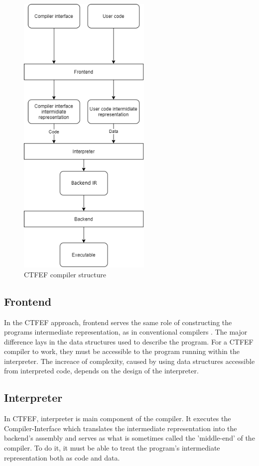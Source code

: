 \begin{figure}
	\includegraphics[height=14cm]{pictures/compiler-structure.png}
	\caption{CTFEF compiler structure}
	\label{CTFE-first-compiler-structure}
\end{figure}

\subsection{Frontend}
\label{frontend}

In the CTFEF approach, frontend serves the same role of constructing the programs intermediate representation, as in conventional compilers \cite{puntambekar:compiler_design}.
The major difference lays in the data structures used to describe the program.
For a CTFEF compiler to work, they must be accessible to the program running within the interpreter.
The increace of complexity, caused by using data structures accessible from interpreted code, depends on the design of the interpreter.


\subsection{Interpreter}
\label{interpreter}

In CTFEF, interpreter is main component of the compiler.
It executes the Compiler-Interface which translates the intermediate representation into the backend's assembly and serves as what is sometimes called the 'middle-end' of the compiler\cite{hsu2021llvm}.
To do it, it must be able to treat the program's intermediate representation both as code and data.

